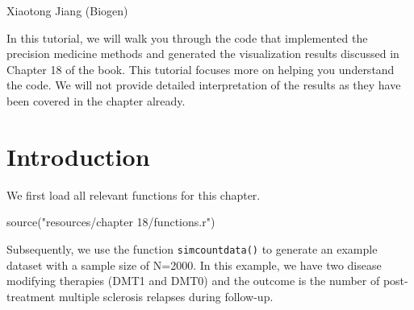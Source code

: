 \documentclass[
  letterpaper,
  DIV=11,
  numbers=noendperiod]{scrreprt}
\newenvironment{Shaded}{\begin{snugshade}}{\end{snugshade}}
\newcommand{\AttributeTok}[1]{\textcolor[rgb]{0.40,0.45,0.13}{#1}}
\newcommand{\CommentTok}[1]{\textcolor[rgb]{0.37,0.37,0.37}{#1}}
\newcommand{\DecValTok}[1]{\textcolor[rgb]{0.68,0.00,0.00}{#1}}
\newcommand{\FloatTok}[1]{\textcolor[rgb]{0.68,0.00,0.00}{#1}}
\newcommand{\FunctionTok}[1]{\textcolor[rgb]{0.28,0.35,0.67}{#1}}
\newcommand{\NormalTok}[1]{\textcolor[rgb]{0.00,0.23,0.31}{#1}}
\newcommand{\OtherTok}[1]{\textcolor[rgb]{0.00,0.23,0.31}{#1}}
\newcommand{\SpecialCharTok}[1]{\textcolor[rgb]{0.37,0.37,0.37}{#1}}
\newcommand{\StringTok}[1]{\textcolor[rgb]{0.13,0.47,0.30}{#1}}
\begin{document}
Xiaotong Jiang (Biogen)

\hfill\break

In this tutorial, we will walk you through the code that implemented the
precision medicine methods and generated the visualization results
discussed in Chapter 18 of the book. This tutorial focuses more on
helping you understand the code. We will not provide detailed
interpretation of the results as they have been covered in the chapter
already.

\hypertarget{introduction-4}{%
\section{Introduction}\label{introduction-4}}

We first load all relevant functions for this chapter.

\begin{Shaded}
\begin{Highlighting}[]
\FunctionTok{source}\NormalTok{(}\StringTok{"resources/chapter 18/functions.r"}\NormalTok{)}
\end{Highlighting}
\end{Shaded}

Subsequently, we use the function \texttt{simcountdata()} to generate an
example dataset with a sample size of N=2000. In this example, we have
two disease modifying therapies (DMT1 and DMT0) and the outcome is the
number of post-treatment multiple sclerosis relapses during follow-up.

\begin{Shaded}
\end{Shaded}
\end{document}
